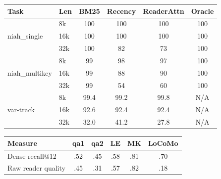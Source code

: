 \begin{table}[!htbp]
\centering
\small
\begin{minipage}[t]{\textwidth}
\centering
\setlength{\tabcolsep}{5pt}
\begin{tabular}{@{}llcccc@{}}
\toprule
\textbf{Task} & \textbf{Len} & \textbf{BM25} & \textbf{Recency} & \textbf{ReaderAttn} & \textbf{Oracle} \\
\midrule
\multirow{3}{*}{niah\_single}   & 8k  & 100 & 100 & 100 & 100 \\
                                & 16k & 100 & 100 & 100 & 100 \\
                                & 32k & 100 & 82  & 73  & 100 \\
\midrule
\multirow{3}{*}{niah\_multikey} & 8k  & 99 & 98 & 97 & 100 \\
                                & 16k & 99 & 88 & 90 & 100 \\
                                & 32k & 99 & 54 & 60 & 100 \\
\midrule
\multirow{3}{*}{var-track}      & 8k  & 99.4 & 99.2 & 99.8 & N/A \\
                                & 16k & 92.6 & 92.4 & 92.4 & N/A \\
                                & 32k & 32.0 & 41.2 & 27.8 & N/A \\
\bottomrule
\end{tabular}
\label{tab:selector}
\end{minipage}

\vspace{6pt}
\begin{minipage}[t]{\textwidth}
\centering
\setlength{\tabcolsep}{5pt}
\begin{tabular}{@{}lccccc@{}}
\toprule
\textbf{Measure} & \textbf{qa1} & \textbf{qa2} & \textbf{LE} & \textbf{MK} & \textbf{LoCoMo} \\
\midrule
Dense recall@12 & .52 & .45 & .58 & .81 & .70 \\
Raw reader quality & .45 & .31 & .57 & .82 & .18 \\
\bottomrule
\end{tabular}
\label{tab:dense-retriever}
\end{minipage}
\end{table}
